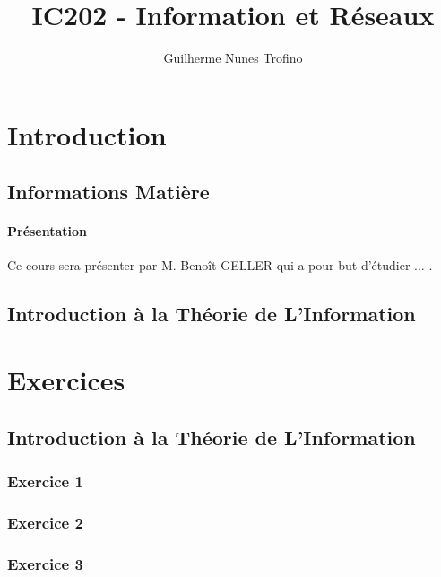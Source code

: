 \documentclass{article}
\title{IC202 - Information et Réseaux}
\author{Guilherme Nunes Trofino}
\begin{document}
\maketitle

\newpage\tableofcontents

\section{Introduction}



\subsection{Informations Matière}
\paragraph{Présentation}Ce cours sera présenter par M. Benoît GELLER qui a pour but d'étudier ... .

\subsection{Introduction à la Théorie de L'Information}


\section{Exercices}

\subsection{Introduction à la Théorie de L'Information}
\subsubsection{Exercice 1}
\begin{resolution}
        
\end{resolution}

\subsubsection{Exercice 2}
\begin{resolution}
    
\end{resolution}

\subsubsection{Exercice 3}
\begin{resolution}
    
\end{resolution}
\end{document}
